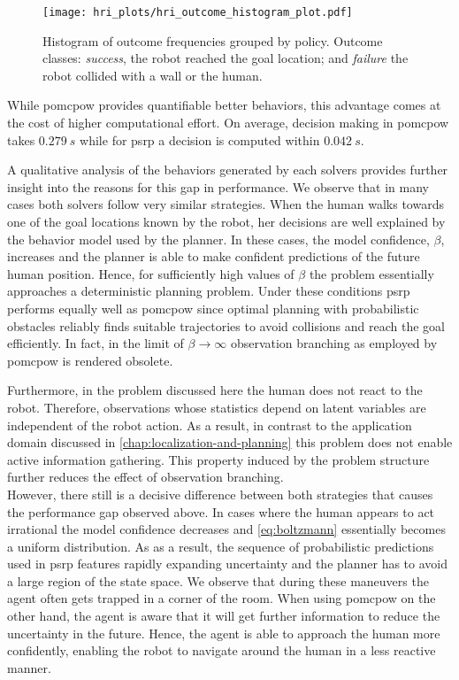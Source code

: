 \begin{figure}[htpb]
  \centering
  \texttt{[image: hri\_plots/hri\_outcome\_histogram\_plot.pdf]}
  \caption{Histogram of outcome frequencies grouped by policy. Outcome classes:
  \emph{success}, the robot reached the goal location; and \emph{failure} the
  robot collided with a wall or the human.}
  \label{fig:hri_outcome_histogram}
\end{figure}

While \ac{pomcpow} provides quantifiable better behaviors, this advantage comes
at the cost of higher computational effort. On average, decision making in
\ac{pomcpow} takes $\SI{0.279}{s}$ while for \ac{psrp} a decision is computed
within $\SI{0.042}{s}$.

A qualitative analysis of the behaviors generated by each solvers provides
further insight into the reasons for this gap in performance. We observe that
in many cases both solvers follow very similar strategies. When the human walks
towards one of the goal locations known by the robot, her decisions are well
explained by the behavior model used by the planner. In these cases, the model
confidence, $\beta$, increases and the planner is able to make confident
predictions of the future human position. Hence, for sufficiently high values
of $\beta$ the problem essentially approaches a deterministic planning problem.
Under these conditions \ac{psrp} performs equally well as \ac{pomcpow} since
optimal planning with probabilistic obstacles reliably finds suitable
trajectories to avoid collisions and reach the goal efficiently. In fact, in
the limit of $\beta \to \infty$ observation branching as employed by
\ac{pomcpow} is rendered obsolete.

Furthermore, in the problem discussed here the human does not react to the
robot. Therefore, observations whose statistics depend on latent variables are
independent of the robot action. As a result, in contrast to the application
domain discussed in \cref{chap:localization-and-planning} this problem does not
enable active information gathering. This property induced by the problem
structure further reduces the effect of observation branching.\\ However, there
still is a decisive difference between both strategies that causes the
performance gap observed above. In cases where the human appears to act
irrational the model confidence decreases and \cref{eq:boltzmann} essentially
becomes a uniform distribution. As as a result, the sequence of probabilistic
predictions used in \ac{psrp} features rapidly expanding uncertainty and the
planner has to avoid a large region of the state space. We observe that during
these maneuvers the agent often gets trapped in a corner of the room. When
using \ac{pomcpow} on the other hand, the agent is aware that it will get
further information to reduce the uncertainty in the future. Hence, the agent
is able to approach the human more confidently, enabling the robot to navigate
around the human in a less reactive manner.


